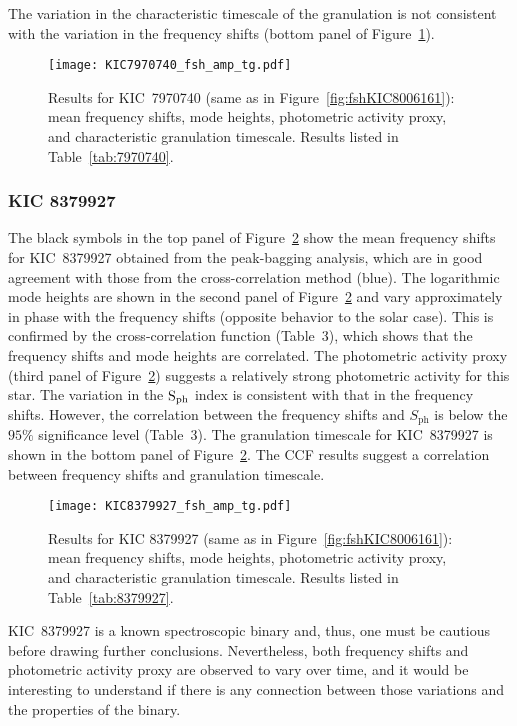 \documentclass[twocolumn]{aastex61}%
\begin{document}
The variation in the characteristic timescale of the granulation is not consistent with the variation in the frequency shifts (bottom panel of Figure~\ref{fig:KIC7970740}).

\begin{figure}[h]
\texttt{[image: KIC7970740\_fsh\_amp\_tg.pdf]}
\caption{Results for KIC~7970740 (same as in Figure~\ref{fig:fshKIC8006161}): mean frequency shifts, mode heights, photometric activity proxy, and characteristic granulation timescale. Results listed in Table~\ref{tab:7970740}.}\label{fig:KIC7970740}
\end{figure} 

\subsubsection{KIC 8379927}

The black symbols in the top panel of Figure~\ref{fig:KIC8379927} show the mean frequency shifts for KIC~8379927 obtained from the peak-bagging analysis, which are in good agreement with those from the cross-correlation method (blue). The logarithmic mode heights are shown in the second panel of Figure~\ref{fig:KIC8379927} and vary approximately in phase with the frequency shifts (opposite behavior to the solar case). This is confirmed by the cross-correlation function (Table~3), which shows that the frequency shifts and mode heights are correlated. The photometric activity proxy (third panel of Figure~\ref{fig:KIC8379927}) suggests a relatively strong photometric activity for this star. The variation in the $\rm S_{\rm ph}$ index is consistent with that in the frequency shifts. 
However, the correlation between the frequency shifts and $S_\text{ph}$ is below the $95\%$ significance level (Table~3). The granulation timescale for KIC~8379927 is shown in the bottom panel of Figure~\ref{fig:KIC8379927}. The CCF results suggest a correlation between frequency shifts and granulation timescale.

\begin{figure}[h]
\texttt{[image: KIC8379927\_fsh\_amp\_tg.pdf]}
\caption{Results for KIC 8379927 (same as in Figure~\ref{fig:fshKIC8006161}): mean frequency shifts, mode heights, photometric activity proxy, and characteristic granulation timescale. Results listed in Table~\ref{tab:8379927}.}\label{fig:KIC8379927}
\end{figure}

KIC~8379927 is a known spectroscopic binary and, thus, one must be cautious before drawing further conclusions. Nevertheless, both frequency shifts and photometric activity proxy are observed to vary over time, and it would be interesting to understand if there is any connection between those variations and the properties of the binary.
\end{document}
